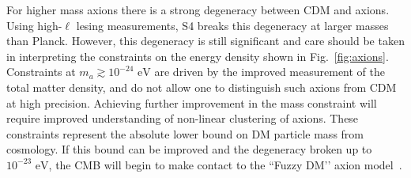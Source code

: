 For higher mass axions there is a strong degeneracy between CDM and axions. Using high-$\ell$ lesing measurements, S4 breaks this degeneracy at larger masses than Planck. However, this degeneracy is still significant and care should be taken in interpreting the constraints on the energy density shown in Fig.~\ref{fig:axions}. Constraints at $m_a\gtrsim 10^{-24}\text{ eV}$ are driven by the improved measurement of the total matter density, and do not allow one to distinguish such axions from CDM at high precision.  Achieving further improvement in the mass constraint will require improved understanding of non-linear clustering of axions. These constraints represent the absolute lower bound on DM particle mass from cosmology. If this bound can be improved and the degeneracy broken up to $10^{-23}\text{ eV}$, the CMB will begin to make contact to the ``Fuzzy DM’’ axion model~\cite{hu:00a, marsh:2013js}. 


%



